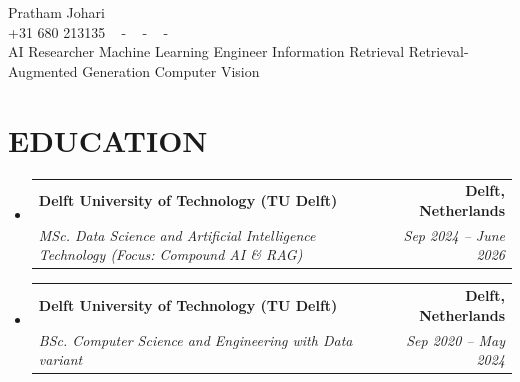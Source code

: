 \documentclass[letterpaper,11pt]{article}
\makeatletter
\newcommand{\resumeSubheading}[4]{
  \vspace{-2pt}\item
    \begin{tabular*}{1.0\textwidth}[t]{l@{\extracolsep{\fill}}r}
      \textbf{\large#1} & \textbf{\small #2} \\
      \textit{\large#3} & \textit{\small #4} \\
    \end{tabular*}\vspace{-7pt}
}
\newcommand{\resumeSubHeadingListStart}{\begin{itemize}[leftmargin=0.0in, label={}]}
\newcommand{\resumeSubHeadingListEnd}{\end{itemize}}
\makeatother
\begin{document}
\begin{center}
  {\huge Pratham Johari}  \\ \vspace{10pt}
  {+31 680 213135} ~
  \small{-}
  \href{https://github.com/pratham2442000}{\color{blue}{github.com/pratham2442000}} ~
  \small{-}
  \href{mailto:pratham244200@gmail.com}{\color{blue}{pratham244200@gmail.com}} ~
  \small{-}
  \href{https://www.linkedin.com/in/prathamjohari/}{ \color{blue}{linkedin.com/in/prathamjohari/}}  ~
  \\
  \vspace{7pt}
  {AI Researcher \textbar{} Machine Learning Engineer \textbar{} Information Retrieval \textbar{} Retrieval-Augmented Generation \textbar{} Computer Vision}
  \vspace{-7pt}
\end{center}

\section{\color{airforceblue}EDUCATION}
\resumeSubHeadingListStart
\resumeSubheading
{Delft University of Technology (TU Delft)}{Delft, Netherlands}
{MSc. Data Science and Artificial Intelligence Technology \textnormal{\small (Focus: Compound AI \& RAG)}}{Sep 2024 -- June 2026}
\resumeSubheading
{Delft University of Technology (TU Delft)}{Delft, Netherlands}
{BSc. Computer Science and Engineering with Data variant}{Sep 2020 -- May 2024}
\resumeSubHeadingListEnd
\vspace{-10pt}
\end{document}
